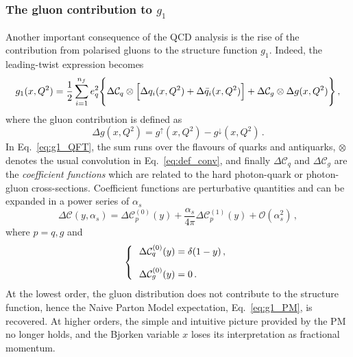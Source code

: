 \subsubsection*{The gluon contribution to $g_1$}
Another important consequence of the QCD analysis is the rise of the contribution from polarised gluons to the structure function $g_1$. Indeed, the leading-twist expression becomes 
\begin{equation}
  g_1(x,Q^2) = \frac{1}{2} \sum_{i=1}^{n_f} e_{q}^2 \Biggl\{ \Delta \mathcal{C}_{q} \otimes \Bigl[ \Delta q_i (x,Q^2) + \Delta \bar{q}_i (x,Q^2) \Bigr] + \Delta \mathcal{C}_{g} \otimes \Delta g (x,Q^2)\Biggr\} \,,
  \label{eq:g1_QFT}
\end{equation}
where the gluon contribution is defined as
\begin{equation}
  \Delta g(x,Q^2) = g^{\uparrow}(x,Q^2) - g^{\downarrow}(x,Q^2) \,.
\end{equation}
In Eq.~\eqref{eq:g1_QFT}, the sum runs over the flavours of quarks and antiquarks, $\otimes$ denotes the usual convolution in Eq.~\eqref{eq:def_conv}, and finally $\Delta \mathcal{C}_{q}$ and $\Delta \mathcal{C}_{g}$ are the \textit{coefficient functions} which are related to the hard photon-quark or photon-gluon cross-sections. Coefficient functions are perturbative quantities and can be expanded in a power series of $\alpha_s$
\begin{equation}
  \Delta \mathcal{C} \left( y, \alpha_s \right) = \Delta \mathcal{C}^{(0)}_{p} (y) + \frac{\alpha_s}{4\pi} \Delta \mathcal{C}^{(1)}_{p} (y) + \mathcal{O}(\alpha_s^2)\,,
\end{equation}
where $p=q,g$ and
\begin{equation}
  \left\{ \hspace{-3mm}
  \begin{array}{cl}
    &\Delta \mathcal{C}_{q}^{(0)} (y) = \delta(1-y)\,,\\[10pt]
    &\Delta \mathcal{C}_{g}^{(0)} (y) = 0 \,.\\
  \end{array}
  \right.
\end{equation}
At the lowest order, the gluon distribution does not contribute to the structure function, hence the Naive Parton Model expectation, Eq.~\eqref{eq:g1_PM}, is recovered. At higher orders, the simple and intuitive picture provided by the PM no longer holds, and the Bjorken variable $x$ loses its interpretation as fractional momentum.\par
